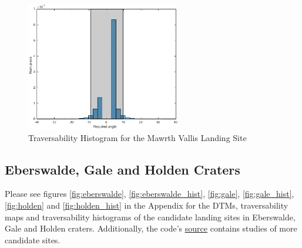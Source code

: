 \documentclass[12pt]{article}
\begin{document}
\begin{figure}[h!]
  \centering
  \includegraphics[width=0.6\textwidth]{figures/maps/ESP_015985_2040/DTEEC_015985_2040_016262_2040_U01-hist.pdf}
  \caption{Traversability Histogram for the Mawrth Vallis Landing Site}
  \label{fig:mawrth_hist}
\end{figure}

\subsection{Eberswalde, Gale and Holden Craters}
Please see figures \ref{fig:eberswalde}, \ref{fig:eberswalde_hist}, \ref{fig:gale}, \ref{fig:gale_hist}, \ref{fig:holden} and \ref{fig:holden_hist} in the Appendix for the DTMs, traversability maps and traversability histograms of the candidate landing sites in Eberswalde, Gale and Holden craters. Additionally, the code's \href{https://github.com/PapaCharlie/Rover-Climb-Angles/tree/master/figures/maps/}{\ttfamily\color{blue} \underline{source}} contains studies of more candidate sites.
\end{document}
